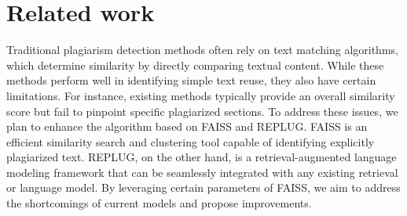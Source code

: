 \section{Related work}
Traditional plagiarism detection methods often rely on text matching algorithms, which determine similarity by directly comparing textual content. While these methods perform well in identifying simple text reuse, they also have certain limitations. For instance, existing methods typically provide an overall similarity score but fail to pinpoint specific plagiarized sections. To address these issues, we plan to enhance the algorithm based on FAISS and REPLUG. FAISS is an efficient similarity search and clustering tool capable of identifying explicitly plagiarized text. REPLUG, on the other hand, is a retrieval-augmented language modeling framework that can be seamlessly integrated with any existing retrieval or language model. By leveraging certain parameters of FAISS, we aim to address the shortcomings of current models and propose improvements.
